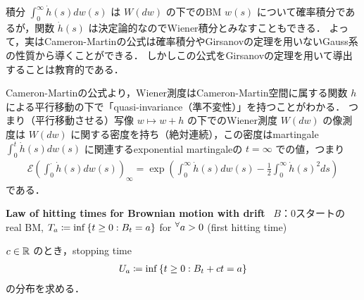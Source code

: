 \documentclass{jsarticle}
\begin{document}
\begin{remark*}
    積分 $\int_0^\infty\dot{h}(s)dw(s)$ は $W(dw)$ の下でのBM $w(s)$ について確率積分であるが，関数 $\dot{h}(s)$ は決定論的なのでWiener積分とみなすこともできる．
    よって，実はCameron-Martinの公式は確率積分やGirsanovの定理を用いないGauss系の性質から導くことができる．
    しかしこの公式をGirsanovの定理を用いて導出することは教育的である．

    Cameron-Martinの公式より，Wiener測度はCameron-Martin空間に属する関数 $h$ による平行移動の下で「quasi-invariance（準不変性）」を持つことがわかる．
    つまり（平行移動させる）写像 $w\mapsto w+h$ の下でのWiener測度 $W(dw)$ の像測度は $W(dw)$ に関する密度を持ち（絶対連続），この密度はmartingale $\int_0^t \dot{h}(s)dw(s)$ に関連するexponential martingaleの $t=\infty$ での値，つまり
    \begin{align}
        \mathcal{E}\left(\int_0^{\cdot}\dot{h}(s)dw(s)\right)_\infty
        = \exp\left(\int_0^\infty \dot{h}(s)dw(s)-\frac{1}{2}\int_0^\infty \dot{h}(s)^2 ds\right)
    \end{align}
    である．
\end{remark*}
\hrulefill

\textbf{Law of hitting times for Brownian motion with drift}~
$B$：0スタートのreal BM, $T_a\coloneqq\inf\left\{t\ge0:B_t=a\right\}$ for ${}^{\forall} a>0$ (first hitting time)

$c\in\mathbb{R}$ のとき，stopping time
\begin{align}
    U_a\coloneqq\inf\left\{t\ge0:B_t+ct=a\right\}
\end{align}
の分布を求める．
\end{document}
